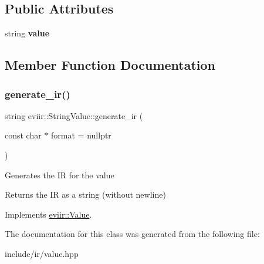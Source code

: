 \subsection*{Public Attributes}
\begin{DoxyCompactItemize}
\item 
\mbox{\label{classeviir_1_1StringValue_a2dc8191eec0dac183451665d080bcafd}} 
string {\bfseries value}
\end{DoxyCompactItemize}


\subsection{Member Function Documentation}
\mbox{\label{classeviir_1_1StringValue_ab8c17f9426e993cd01bd67958aba0038}} 
\subsubsection{\texorpdfstring{generate\+\_\+ir()}{generate\_ir()}}
{\footnotesize\ttfamily string eviir\+::\+String\+Value\+::generate\+\_\+ir (\begin{DoxyParamCaption}\item[{const char $\ast$}]{format = {\ttfamily nullptr} }\end{DoxyParamCaption})\hspace{0.3cm}{\ttfamily [virtual]}}

Generates the IR for the value \begin{DoxyReturn}{Returns}
the IR as a string (without newline) 
\end{DoxyReturn}


Implements \hyperlink{classeviir_1_1Value_a0613bf660425df31e230681555f64dea}{eviir\+::\+Value}.



The documentation for this class was generated from the following file\+:\begin{DoxyCompactItemize}
\item 
include/ir/value.\+hpp\end{DoxyCompactItemize}
